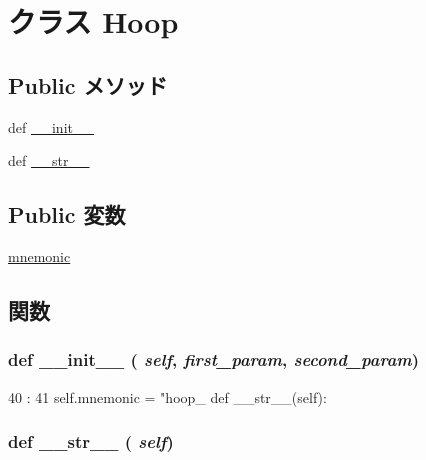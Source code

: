 \hypertarget{classmicro__asm__test_1_1Hoop}{
\section{クラス Hoop}
\label{classmicro__asm__test_1_1Hoop}
}
\subsection*{Public メソッド}
\begin{DoxyCompactItemize}
\item 
def \hyperlink{classmicro__asm__test_1_1Hoop_ac775ee34451fdfa742b318538164070e}{\_\-\_\-init\_\-\_\-}
\item 
def \hyperlink{classmicro__asm__test_1_1Hoop_aa7a4b9bc0941308e362738503137460e}{\_\-\_\-str\_\-\_\-}
\end{DoxyCompactItemize}
\subsection*{Public 変数}
\begin{DoxyCompactItemize}
\item 
\hyperlink{classmicro__asm__test_1_1Hoop_aaf1ad8da0f374cbd19a0a177d5280477}{mnemonic}
\end{DoxyCompactItemize}


\subsection{関数}
\hypertarget{classmicro__asm__test_1_1Hoop_ac775ee34451fdfa742b318538164070e}{
\subsubsection[{\_\-\_\-init\_\-\_\-}]{\setlength{\rightskip}{0pt plus 5cm}def \_\-\_\-init\_\-\_\- ( {\em self}, \/   {\em first\_\-param}, \/   {\em second\_\-param})}}
\label{classmicro__asm__test_1_1Hoop_ac775ee34451fdfa742b318538164070e}



\begin{DoxyCode}
40                                                  :
41         self.mnemonic = "hoop_%
    def __str__(self):
\end{DoxyCode}
\hypertarget{classmicro__asm__test_1_1Hoop_aa7a4b9bc0941308e362738503137460e}{
\subsubsection[{\_\-\_\-str\_\-\_\-}]{\setlength{\rightskip}{0pt plus 5cm}def \_\-\_\-str\_\-\_\- ( {\em self})}}
\label{classmicro__asm__test_1_1Hoop_aa7a4b9bc0941308e362738503137460e}



